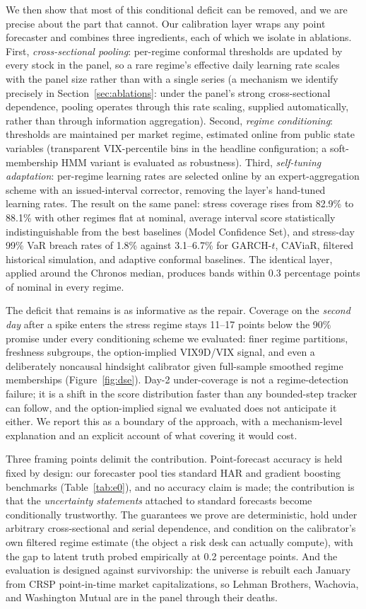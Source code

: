 We then show that most of this conditional deficit can be removed, and
we are precise about the part that cannot. Our calibration layer wraps any
point forecaster and combines three ingredients, each of which we isolate
in ablations. First, \emph{cross-sectional pooling}: per-regime conformal
thresholds are updated by every stock in the panel, so a rare regime's
effective daily learning rate scales with the panel size rather than
with a single series (a mechanism we identify precisely in
Section~\ref{sec:ablations}: under the panel's strong cross-sectional
dependence, pooling operates through this rate scaling, supplied
automatically, rather than through information aggregation). Second, \emph{regime conditioning}:
thresholds are maintained per market regime, estimated online from public
state variables (transparent VIX-percentile bins in the headline
configuration; a soft-membership HMM variant is evaluated as robustness).
Third, \emph{self-tuning adaptation}: per-regime learning rates are
selected online by an expert-aggregation scheme with an issued-interval
corrector, removing the layer's hand-tuned learning rates. The result on the same
panel: stress coverage rises from 82.9\% to 88.1\% with other regimes flat
at nominal, average interval score statistically indistinguishable from
the best baselines (Model Confidence Set), and stress-day 99\% VaR breach
rates of 1.8\% against 3.1--6.7\% for GARCH-$t$, CAViaR, filtered
historical simulation, and adaptive conformal baselines. The identical
layer, applied around the Chronos median, produces bands within 0.3
percentage points of nominal in every regime.

The deficit that remains is as informative as the repair. Coverage on the
\emph{second day} after a spike enters the stress regime stays 11--17
points below the 90\% promise under every conditioning scheme we
evaluated: finer regime partitions, freshness subgroups, the
option-implied VIX9D/VIX signal, and even a deliberately noncausal
hindsight calibrator given full-sample smoothed regime memberships
(Figure~\ref{fig:dse}). Day-2 under-coverage is not a regime-detection
failure; it is a shift in the score distribution faster than any
bounded-step tracker can follow, and the option-implied signal we
evaluated does not anticipate it either. We report this as a boundary
of the approach, with a mechanism-level explanation and an explicit
account of what covering it would cost.

Three framing points delimit the contribution. Point-forecast accuracy is
held fixed by design: our forecaster pool ties standard HAR and gradient
boosting benchmarks (Table~\ref{tab:e0}), and no accuracy claim is made;
the contribution is that the \emph{uncertainty statements} attached to
standard forecasts become conditionally trustworthy. The guarantees we
prove are deterministic, hold under arbitrary cross-sectional and serial
dependence, and condition on the calibrator's own filtered regime estimate
(the object a risk desk can actually compute), with the gap to latent
truth probed empirically at 0.2 percentage points. And the evaluation
is designed against survivorship: the universe is rebuilt each January
from CRSP point-in-time market capitalizations, so Lehman Brothers,
Wachovia, and Washington Mutual are in the panel through their deaths.

